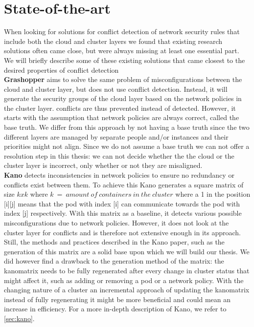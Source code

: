 \section{State-of-the-art} \label{sec:stateoftheart}
When looking for solutions for conflict detection of network security rules that include both the cloud and cluster layers we found that existing research solutions often came close, but were always missing at least one essential part. We will briefly describe some of these existing solutions that came closest to the desired properties of conflict detection
\\[10pt]

\textbf{Grashopper} \cite{grashopper}  aims to solve the same problem of misconfigurations between the cloud and cluster layer, but does not use conflict detection. Instead, it will generate the security groups of the cloud layer based on the network policies in the cluster layer. conflicts are thus prevented instead of detected. However, it starts with the assumption that network policies are always correct, called the base truth. We differ from this approach by not having a base truth since the two different layers are managed by separate people and/or instances and their priorities might not align. Since we do not assume a base truth we can not offer a resolution step in this thesis: we can not decide whether the the cloud or the cluster layer is incorrect, only whether or not they are misaligned.
\\[10pt]

\textbf{Kano} \cite{kano} detects inconsistencies in network policies to ensure no redundancy or conflicts exist between them. 
To achieve this Kano generates a square matrix of size \(kxk\) where \(k\ =\ amount\  of\  containers\  in\  the\  cluster\) where a 1 in the position [i][j] means that the pod with index [i] can communicate towards the pod with index [j] respectively. With this matrix as a baseline, it detects various possible misconfigurations due to network policies. However, it does not look at the cluster layer for conflicts and is therefore not extensive enough in its approach. Still, the methods and practices described in the Kano paper, such as the generation of this matrix are a solid base upon which we will build our thesis. We did however find a drawback to the generation method of the matrix: the kanomatrix needs to be fully regenerated after every change in cluster status that might affect it, such as adding or removing a pod or a network policy. With the changing nature of a cluster an incremental approach of updating the kanomatrix instead of fully regenerating it might be more beneficial and could mean an increase in efficiency. For a more in-depth description of Kano, we refer to \autoref{sec:kano}.
\\[10pt]

